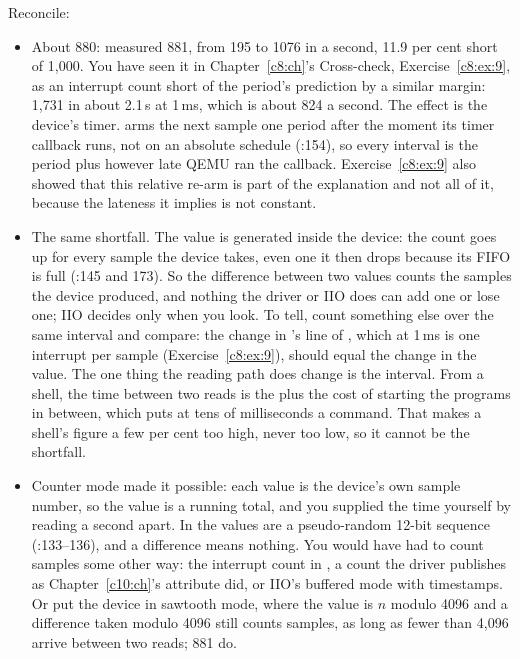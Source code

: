  Reconcile:
\begin{itemize}
  \item About 880:  measured 881, from 195 to 1076 in a second, 11.9 per cent
    short of 1,000. You have seen it in Chapter~\ref{c8:ch}'s Cross-check,
    Exercise~\ref{c8:ex:9}, as an interrupt count short of the period's prediction by a similar
    margin: 1,731 in about 2.1\,s at 1\,ms, which is about 824 a second. The effect is the device's
    timer.  arms the next sample one period after the moment its timer callback runs,
    not on an absolute schedule (:154), so every interval is the period plus however
    late QEMU ran the callback. Exercise~\ref{c8:ex:9} also showed that this relative re-arm is
    part of the explanation and not all of it, because the lateness it implies is not constant.
  \item The same shortfall. The value is generated inside the device: the count goes up for every
    sample the device takes, even one it then drops because its FIFO is full (:145
    and 173). So the difference between two values counts the samples the device produced, and
    nothing the driver or IIO does can add one or lose one; IIO decides only when you look. To tell,
    count something else over the same interval and compare: the change in 's line of
    , which at 1\,ms is one interrupt per sample (Exercise~\ref{c8:ex:9}),
    should equal the change in the value. The one thing the reading path does change is the
    interval. From a shell, the time between two reads is the  plus the cost of
    starting the programs in between, which  puts at tens of milliseconds a
    command. That makes a shell's figure a few per cent too high, never too low, so it cannot be the
    shortfall.
  \item Counter mode made it possible: each value is the device's own sample number, so the value
    is a running total, and you supplied the time yourself by reading a second apart. In
     the values are a pseudo-random 12-bit sequence
    (:133--136), and a difference means nothing. You would have had to count samples
    some other way: the interrupt count in , a count the driver publishes as
    Chapter~\ref{c10:ch}'s  attribute did, or IIO's buffered mode with timestamps. Or
    put the device in sawtooth mode, where the value is $n$ modulo 4096 and a difference taken
    modulo 4096 still counts samples, as long as fewer than 4,096 arrive between two reads; 881 do.
\end{itemize}


